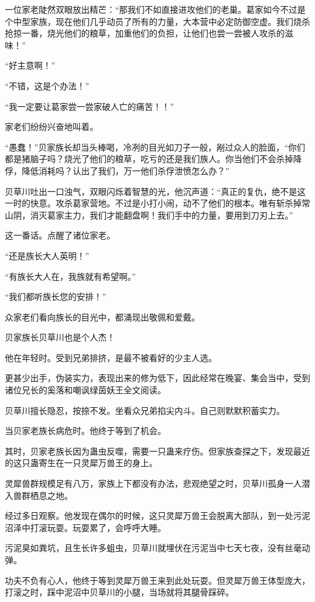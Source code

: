 \begin{this_body}
一位家老陡然双眼放出精芒：“那我们不如直接进攻他们的老巢。葛家如今不过是个中型家族，现在他们几乎动员了所有的力量，大本营中必定防御空虚。我们烧杀抢掠一番，烧光他们的粮草，加重他们的负担，让他们也尝一尝被人攻杀的滋味！”

“好主意啊！”

“不错，这是个办法！”

“我一定要让葛家尝一尝家破人亡的痛苦！！”

家老们纷纷兴奋地叫着。

“愚蠢！”贝家族长却当头棒喝，冷冽的目光如刀子一般，剐过众人的脸面，“你们都是猪脑子吗？烧光了他们的粮草，吃亏的还是我们族人。你当他们不会杀掉降俘，降低消耗吗？认出了我们，万一他们杀俘泄愤怎么办？”

贝草川吐出一口浊气，双眼闪烁着智慧的光，他沉声道：“真正的复仇，绝不是这一时的快意。攻杀葛家营地。不过是小打小闹，动不了他们的根本。唯有斩杀掉常山阴，消灭葛家主力，我们才能翻盘啊！我们手中的力量，要用到刀刃上去。”

这一番话。点醒了诸位家老。

“还是族长大人英明！”

“有族长大人在，我族就有希望啊。”

“我们都听族长您的安排！”

众家老们看向族长的目光中，都涌现出敬佩和爱戴。

贝家族长贝草川也是个人杰！

他在年轻时。受到兄弟排挤，是最不被看好的少主人选。

更甚少出手，伪装实力，表现出来的修为低下，因此经常在晚宴、集会当中，受到诸位兄长的奚落和嘲讽绿茵妖王全文阅读。

贝草川擅长隐忍，按捺不发。坐看众兄弟掐尖内斗。自己则默默积蓄实力。

当贝家老族长病危时。他终于等到了机会。

其时，贝家老族长因为蛊虫反噬，需要一只蛊来疗伤。但家族查探之下，发现最近的这只蛊寄生在一只灵犀万兽王的身上。

灵犀兽群规模足有八万，家族上下都没有办法，悲观绝望之时，贝草川孤身一人潜入兽群栖息之地。

经过多日观察。他发现在偶尔的时候，这只灵犀万兽王会脱离大部队，到一处污泥沼泽中打滚玩耍。玩耍累了，会呼呼大睡。

污泥臭如粪坑，且生长许多蛆虫，贝草川就埋伏在污泥当中七天七夜，没有丝毫动弹。

功夫不负有心人，他终于等到灵犀万兽王来到此处玩耍。但灵犀万兽王体型庞大，打滚之时，踩中泥沼中贝草川的小腿，当场就将其腿骨踩碎。


\end{this_body}
